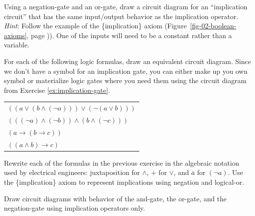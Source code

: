 \begin{ExerciseList}
\Exercise\label{ex:implication-gate}
Using a negation-gate and an or-gate,
draw a circuit diagram for an ``implication circuit''
that has the same input/output behavior as the implication operator.\\
\emph{Hint}: Follow the example of the \{implication\} axiom
(Figure~\ref{fig-02-boolean-axioms}, page \pageref{fig-02-boolean-axioms})).
One of the inputs will need to be a constant rather than a variable.

\Exercise For each of the following logic formulas,
draw an equivalent circuit diagram.
Since we don't have a symbol for an implication gate,
you can either make up you own symbol or
materialize logic gates where you need them
using the circuit diagram from Exercise \ref{ex:implication-gate}.
\begin{center}
\begin{tabular}{l}
$((a \vee (b \wedge (\neg a))) \vee (\neg (a \vee b)))$ \\
$(((\neg a) \wedge (\neg b)) \wedge (b \wedge (\neg c)))$ \\
$(a \rightarrow (b \rightarrow c))$ \\
$((a \wedge b) \rightarrow c)$ \\
\end{tabular}
\end{center}

\Exercise Rewrite each of the formulas in the previous exercise
in the algebraic notation used by electrical engineers:
juxtaposition for $\wedge$, + for $\vee$, and $\overline{a}$ for $(\neg a)$.
Use the \{implication\} axiom to represent
implications using negation and logical-or.

\Exercise Draw circuit diagrams with behavior
of the and-gate, the or-gate, and the negation-gate
using implication operators only.
\end{ExerciseList}



